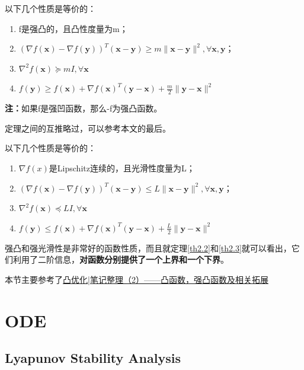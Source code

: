 \documentclass[lang=cn,10pt]{elegantbook}
\newcommand\bv[1]{\boldsymbol{#1}}
\begin{document}
\begin{theorem}
	\label{th2.2}
	以下几个性质是等价的：
	\begin{enumerate}[1、]
		\item f是强凸的，且凸性度量为m；
		\item $(\nabla f(\bv{x})-\nabla f(\bv{y}))^T(\bv{x-y})\geq m\|\bv{x-y}\|^2,\forall \bv{x,y}$；
		\item $\nabla^2f(\bv{x})\succeq mI,\forall \bv{x}$
		\item $f(\bv{y})\geq f(\bv{x})+\nabla f(\bv{x})^T(\bv{y-x})+\frac m2\|\bv{y-x}\|^2$
	\end{enumerate}
\end{theorem}
\textbf{注：}如果f是强凹函数，那么-f为强凸函数。

定理之间的互推略过，可以参考本文的最后。

\begin{theorem}
	\label{th2.3}
	以下几个性质是等价的：
	\begin{enumerate}[1、]
		\item $\nabla f(x)$是Lipschitz连续的，且光滑性度量为L；
		\item $(\nabla f(\bv{x})-\nabla f(\bv{y}))^T(\bv{x-y})\leq L\|\bv{x-y}\|^2,\forall \bv{x,y}$；
		\item $\nabla^2f(\bv{x})\preceq LI,\forall \bv{x}$
		\item $f(\bv{y})\leq f(\bv{x})+\nabla f(\bv{x})^T(\bv{y-x})+\frac L2\|\bv{y-x}\|^2$
	\end{enumerate}
\end{theorem}

强凸和强光滑性是非常好的函数性质，而且就定理\ref{th2.2}和\ref{th2.3}就可以看出，它们利用了二阶信息，\textbf{对函数分别提供了一个上界和一个下界}。

本节主要参考了\href{https://zhuanlan.zhihu.com/p/210252556}{凸优化|笔记整理（2）——凸函数，强凸函数及相关拓展}

\chapter{ODE}
\section{Lyapunov Stability Analysis}
\end{document}
